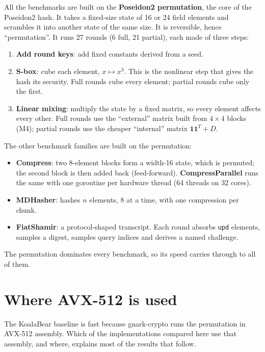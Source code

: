 \documentclass[10pt,a4paper]{article}
\begin{document}
All the benchmarks are built on the \textbf{Poseidon2 permutation}, the core of the Poseidon2
hash. It takes a fixed-size state of 16 or 24 field elements and scrambles it into another
state of the same size. It is reversible, hence ``permutation''. It runs 27 rounds (6 full,
21 partial), each made of three steps:
\begin{enumerate}
  \item \textbf{Add round keys}: add fixed constants derived from a seed.
  \item \textbf{S-box}: cube each element, $x \mapsto x^3$. This is the nonlinear step that
    gives the hash its security. Full rounds cube every element; partial rounds cube only the
    first.
  \item \textbf{Linear mixing}: multiply the state by a fixed matrix, so every element
    affects every other. Full rounds use the ``external'' matrix built from $4\times4$
    blocks (M4); partial rounds use the cheaper ``internal'' matrix $\mathbf{1}\mathbf{1}^T
    + D$.
\end{enumerate}
The other benchmark families are built on the permutation:
\begin{itemize}
  \item \textbf{Compress}: two 8-element blocks form a width-16 state, which is permuted;
    the second block is then added back (feed-forward). \textbf{CompressParallel} runs the
    same with one goroutine per hardware thread (64 threads on 32 cores).
  \item \textbf{MDHasher}: hashes $n$ elements, 8 at a time, with one compression per chunk.
  \item \textbf{FiatShamir}: a protocol-shaped transcript. Each round absorbs \texttt{upd}
    elements, samples a digest, samples query indices and derives a named challenge.
\end{itemize}
The permutation dominates every benchmark, so its speed carries through to all of them.

\section{Where AVX-512 is used}\label{sec:avx}

The KoalaBear baseline is fast because gnark-crypto runs the permutation in AVX-512
assembly. Which of the implementations compared here use that assembly, and where, explains
most of the results that follow.
\end{document}
